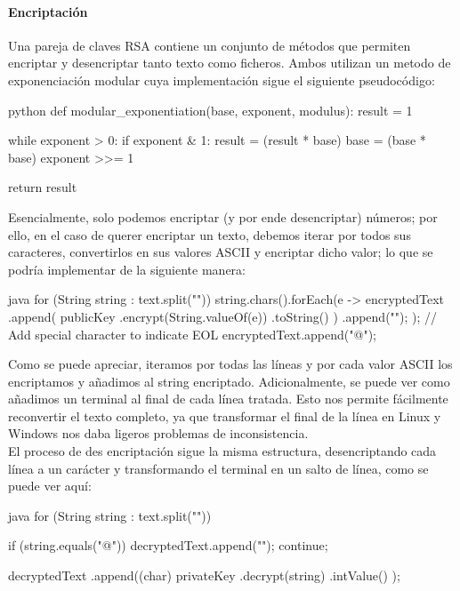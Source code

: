\paragraph{Encriptación}
Una pareja de claves RSA contiene un conjunto de métodos que permiten encriptar y desencriptar tanto texto como ficheros. Ambos utilizan un metodo de exponenciación modular\cite{Modular exponentiation} cuya implementación sigue el siguiente pseudocódigo:
\begin{code}{\scriptsize}{python}
def modular_exponentiation(base, exponent, modulus):
    result = 1

    while exponent > 0:
        if exponent & 1:
            result = (result * base) %
        base = (base * base) %
        exponent >>= 1

    return result
\end{code}
Esencialmente, solo podemos encriptar (y por ende desencriptar) números; por ello, en el caso de querer encriptar un texto, debemos iterar por todos sus caracteres, convertirlos en sus valores ASCII y encriptar dicho valor; lo que se podría implementar de la siguiente manera:
\begin{code}{\scriptsize}{java}
for (String string : text.split("\n")) {
    string.chars().forEach(e -> 
        encryptedText
            .append(
                publicKey
                    .encrypt(String.valueOf(e))
                    .toString()
            )
            .append("\n");
	);
	// Add special character to indicate EOL 
	encryptedText.append("@\n");
}
\end{code}
Como se puede apreciar, iteramos por todas las líneas y por cada valor ASCII los encriptamos y añadimos al string encriptado. Adicionalmente, se puede ver como añadimos un terminal  al final de cada línea tratada. Esto nos permite fácilmente reconvertir el texto completo, ya que transformar el final de la línea en Linux y Windows nos daba ligeros problemas de inconsistencia.\\

El proceso de des encriptación sigue la misma estructura, desencriptando cada línea a un carácter y transformando el terminal en un salto de línea, como se puede ver aquí:
\begin{code}{\scriptsize}{java}
for (String string : text.split("\n")) {
	if (string.equals("@")) {
		decryptedText.append("\n");
		continue;
	}
 
	decryptedText
        .append((char) privateKey
            .decrypt(string)
            .intValue()
        );
}
\end{code}
